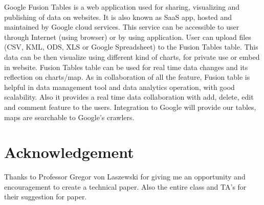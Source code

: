 \documentclass[9pt,twocolumn,twoside]{styles/osajnl}
\begin{document}
Google Fusion Tables is a web application used for sharing, visualizing and publishing of data on websites. It is also known as SaaS app, hosted and maintained by Google cloud services. This service can be accessible to user through Internet (using browser) or by using application. User can upload files (CSV, KML, ODS, XLS or Google Spreadsheet) to the Fusion Tables table. This data can be then visualize using different kind of charts, for private use or embed in website. Fusion Tables table can be used for real time data changes and its reflection on charts/map. As in collaboration of all the feature, Fusion table is helpful in data management tool and data analytics operation, with good scalability. Also it provides a real time data collaboration with add, delete, edit and comment feature to the users. Integration to Google will provide our tables, maps are searchable to Google’s crawlers.  


\section{Acknowledgement}


Thanks to Professor Gregor von Laszewski for giving me an opportunity and encouragement to create a technical paper.
Also the entire class and TA's for their suggestion for paper.



 
\end{document}
